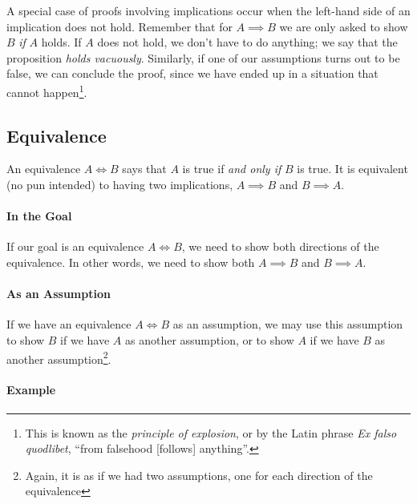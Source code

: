\documentclass{tufte-handout}
\begin{document}
A special case of proofs involving implications occur when the
left-hand side of an implication does not hold. Remember that for
$A \implies B$ we are only asked to show $B$ \emph{if} $A$ holds.
If $A$ does not hold, we don't have to do anything; we say that
the proposition \emph{holds vacuously}. Similarly, if one of our
assumptions turns out to be false, we can conclude the proof,
since we have ended up in a situation that cannot
happen\footnote{This is known as the \emph{principle of
    explosion}, or by the Latin phrase \emph{Ex falso quodlibet},
  ``from falsehood [follows] anything''.}.


\subsection{Equivalence}

An equivalence $A \iff B$ says that $A$ is true if \emph{and only
  if} $B$ is true. It is equivalent (no pun intended) to having
two implications, $A \implies B$ and $B \implies A$.

\paragraph{In the Goal}
If our goal is an equivalence $A \iff B$, we need to show both
directions of the equivalence. In other words, we need to show
both $A \implies B$ and $B \implies A$.

\paragraph{As an Assumption}
If we have an equivalence $A \iff B$ as an assumption, we may use
this assumption to show $B$ if we have $A$ as another assumption,
or to show $A$ if we have $B$ as another
assumption\footnote{Again, it is as if we had two assumptions, one
  for each direction of the equivalence}.

\paragraph{Example}
\end{document}
